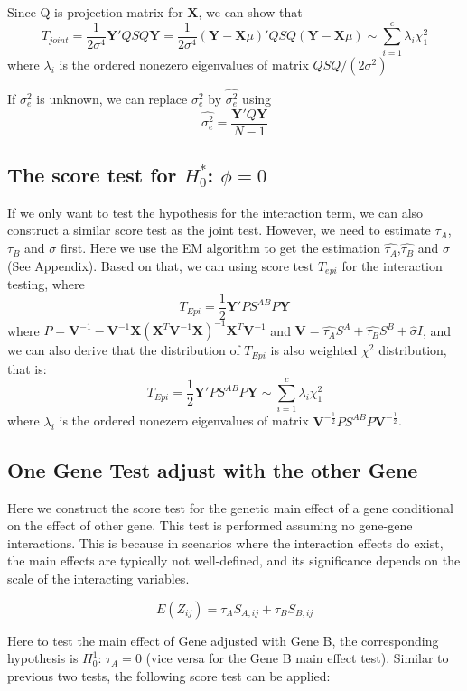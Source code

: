 \documentclass{article}
\newcommand{\Y}{\mathbf{Y}}
\newcommand{\X}{\mathbf{X}}
\newcommand{\V}{\mathbf{V}}
\newcommand{\VV}{\mathbf{V}^{-1}}
\begin{document}
        Since Q is projection matrix for $\X$, we can show that
        \[
            T_{joint}=\frac{1}{2\sigma^4}\Y'QSQ\Y=\frac{1}{2\sigma^4}(\Y-\X\mu)'QSQ(\Y-\X\mu)\sim\sum_{i=1}^c\lambda_i\chi^2_1
        \]
        where $\lambda_i$ is the ordered nonezero eigenvalues of matrix $QSQ/(2\sigma^2)$

        If $\sigma^2_e$ is unknown, we can replace $\sigma^2_e$ by $\hat{\sigma^2_e}$ using
        \[
            \hat{\sigma^2_e}=\frac{\Y'Q\Y}{N-1}
        \]

        \subsection{The score test for $H_0^*$: $\phi=0$}
        If we only want to test the hypothesis for the interaction term, we can also construct a similar score test as the joint test. However, we need to estimate $\tau_A$, $\tau_B$ and $\sigma$ first. Here we use the EM algorithm to get the estimation $\hat{\tau_A}$,$\hat{\tau_B}$ and $\hat{\sigma}$(See Appendix). Based on that, we can using score test $T_{epi}$ for the interaction testing, where
        \[
            T_{Epi}=\frac{1}{2}\Y'PS^{AB}P\Y
        \]
        where $P=\VV-\VV\X(\X^T\VV\X)^{-1}\X^T\VV$ and $\V=\hat{\tau_A}S^A+\hat{\tau_B}S^B+\hat{\sigma}I$, and we can also derive that the distribution of $T_{Epi}$ is also weighted $\chi^2$ distribution, that is:
        \[
            T_{Epi}=\frac{1}{2}\Y'PS^{AB}P\Y\sim\sum_{i=1}^c\lambda_i\chi^2_1
        \]
        where $\lambda_i$ is the  ordered nonezero eigenvalues of matrix $\V^{-\frac{1}{2}}PS^{AB}P\V^{-\frac{1}{2}}$.

        \subsection{One Gene Test adjust with the other Gene}

        Here we construct the score test for the genetic main effect of a gene conditional on the effect of other gene. This test is performed assuming no gene-gene interactions. This is because in scenarios where the interaction effects do exist, the main effects are typically not well-defined, and its significance depends on the scale of the interacting variables.

        \[
            E(Z_{ij})=\tau_AS_{A,ij}+\tau_BS_{B,ij}
        \]

        Here to test the main effect of Gene adjusted with Gene B, the corresponding hypothesis is $H_0^1$: $\tau_A=0$ (vice versa for the Gene B main effect test). Similar to previous two tests, the following score test can be applied:
\end{document}
